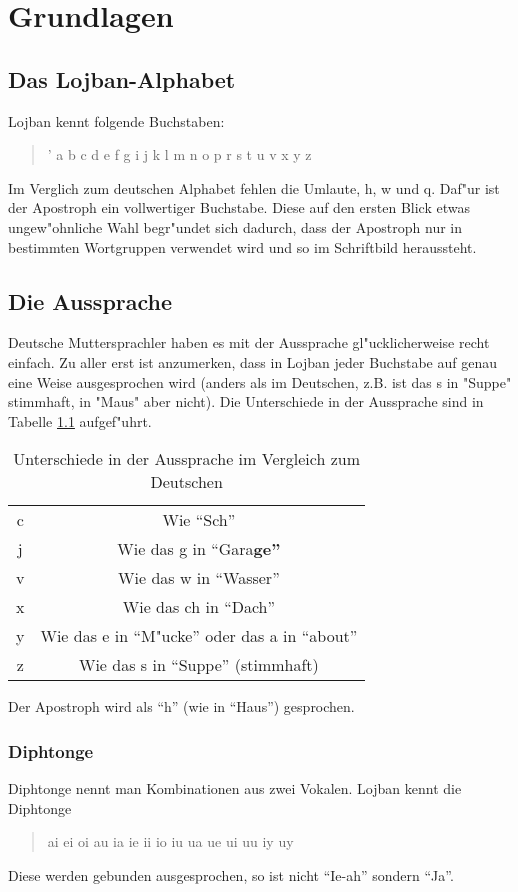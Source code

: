 \chapter{Grundlagen}
\section{Das Lojban-Alphabet}
Lojban kennt folgende Buchstaben:
\begin{quote}
' a b c d e f g i j k l m n o p r s t u v x y z
\end{quote}
Im Verglich zum deutschen Alphabet fehlen die Umlaute, h, w und q. Daf"ur ist der Apostroph ein vollwertiger Buchstabe. Diese
auf den ersten Blick etwas ungew"ohnliche Wahl begr"undet sich dadurch, dass der Apostroph nur in bestimmten Wortgruppen verwendet wird
und so im Schriftbild heraussteht.

\section{Die Aussprache}
Deutsche Muttersprachler haben es mit der Aussprache gl"ucklicherweise recht einfach. Zu aller erst ist anzumerken, dass in Lojban jeder Buchstabe auf genau eine Weise ausgesprochen wird (anders als im Deutschen, z.B. ist das s in "Suppe" stimmhaft, in "Maus" aber nicht).
Die Unterschiede in der Aussprache sind in Tabelle \ref{tbl:aussprache} aufgef"uhrt.
\begin{table}
\centering
\begin{tabular}{|c|c|}
\hline
c & Wie ``Sch'' \\
j & Wie das g in ``Gara\bf{g}e'' \\ %
v & Wie das w in ``Wasser''\\
x & Wie das ch in ``Dach'' \\
y & Wie das e in ``M"ucke'' oder das a in ``about'' \\
z & Wie das s in ``Suppe'' (stimmhaft) \\
\hline
\end{tabular}
\caption{Unterschiede in der Aussprache im Vergleich zum Deutschen}
\label{tbl:aussprache}
\end{table}
Der Apostroph wird als ``h'' (wie in ``Haus'') gesprochen.

\subsection{Diphtonge}
Diphtonge nennt man Kombinationen aus zwei Vokalen. Lojban kennt die Diphtonge
\begin{quote}
ai ei oi au ia ie ii io iu ua ue ui uu iy uy
\end{quote}
Diese werden gebunden ausgesprochen, so ist  nicht ``Ie-ah'' sondern ``Ja''.

